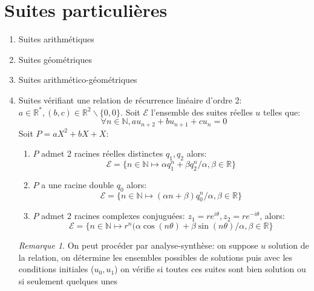 \documentclass[fleqn]{article}
\theoremstyle{definition} \newtheorem*{defi}{D\'efinition}
\theoremstyle{definition} \newtheorem*{theo}{Th\'eor\`eme}
\theoremstyle{definition} \newtheorem*{prop}{Propri\'et\'e}
\theoremstyle{definition} \newtheorem*{coro}{Corollaire}
\theoremstyle{remark} \newtheorem*{rqs}{Remarque}
\begin{document}
\section{Suites particuli\`eres}
\begin{enumerate}
	\item Suites arithm\'etiques
	\item Suites g\'eom\'etriques
	\item Suites arithm\'etico-g\'eom\'etriques
	\item Suites v\'erifiant une relation de r\'ecurrence lin\'eaire d'ordre 2: \\
		$a \in \mathbb{R}^*, (b,c) \in \mathbb{R}^2\backslash\{0,0\}$. Soit $\mathscr{E}$ l'ensemble des suites r\'eelles $u$ telles que:
		\[\forall n \in \mathbb{N}, au_{n+2} + bu_{n+1} + cu_n = 0\]
		Soit $P = aX^2 + bX + X$:
		\begin{enumerate}
			\item $P$ admet 2 racines r\'eelles distinctes $q_1, q_2$ alors:
				\[\mathscr{E} = \{n \in \mathbb{N} \mapsto \alpha q_1^n + \beta q_2^n / \alpha, \beta \in \mathbb{R}\}\]
			\item $P$ a une racine double $q_0$ alors:
				\[\mathscr{E} = \{n \in \mathbb{N} \mapsto (\alpha n + \beta) q_0^n / \alpha, \beta \in \mathbb{R}\}\]
			\item $P$ admet 2 racines complexes conjugu\'ees: $z_1 = re^{i\theta}, z_2 = re^{-i\theta}$, alors:
				\[\mathscr{E} = \{n \in \mathbb{N} \mapsto r^n(\alpha \cos(n\theta) + \beta \sin(n\theta) / \alpha, \beta \in \mathbb{R}\}\]
		\end{enumerate}
		\begin{rqs}
			On peut proc\'eder par analyse-synth\`ese: on suppose $u$ solution de la relation, on d\'etermine les ensembles possibles de
			solutions puis avec les conditions initiales ($u_0, u_1$) on v\'erifie si toutes ces suites sont bien solution ou si seulement
			quelques unes
		\end{rqs}
\end{enumerate}
\end{document}
